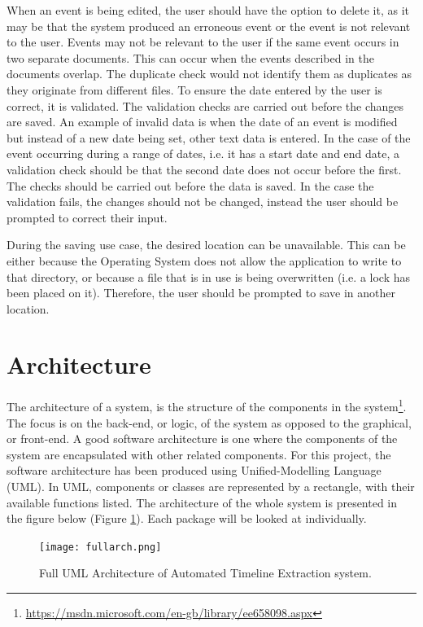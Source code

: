 \par When an event is being edited, the user should have the option to delete it, as it may be that the system produced an erroneous event or the event is not relevant to the user. Events may not be relevant to the user if the same event occurs in two separate documents. This can occur when the events described in the documents overlap. The duplicate check would not identify them as duplicates as they originate from different files. To ensure the date entered by the user is correct, it is validated. The validation checks are carried out before the changes are saved. An example of invalid data is when the date of an event is modified but instead of a new date being set, other text data is entered. In the case of the event occurring during a range of dates, i.e. it has a start date and end date, a validation check should be that the second date does not occur before the first. The checks should be carried out before the data is saved. In the case the validation fails, the changes should not be changed, instead the user should be prompted to correct their input.
\par During the saving use case, the desired location can be unavailable. This can be either because the Operating System does not allow the application to write to that directory, or because a file that is in use is being overwritten (i.e. a lock has been placed on it). Therefore, the user should be prompted to save in another location.

\section{Architecture}
\par The architecture of a system, is the structure of the components in the system\footnote{\url{https://msdn.microsoft.com/en-gb/library/ee658098.aspx}}. The focus is on the back-end, or logic, of the system as opposed to the graphical, or front-end. A good software architecture is one where the components of the system are encapsulated with other related components. For this project, the software architecture has been produced using Unified-Modelling Language (UML). In UML, components or classes are represented by a rectangle, with their available functions listed. The architecture of the whole system is presented in the figure below (Figure \ref{fig:fullArch}). Each package will be looked at individually.
\begin{figure}[H]
\caption{Full UML Architecture of Automated Timeline Extraction system.}
\label{fig:fullArch}
\texttt{[image: fullarch.png]}
\centering
\end{figure}
